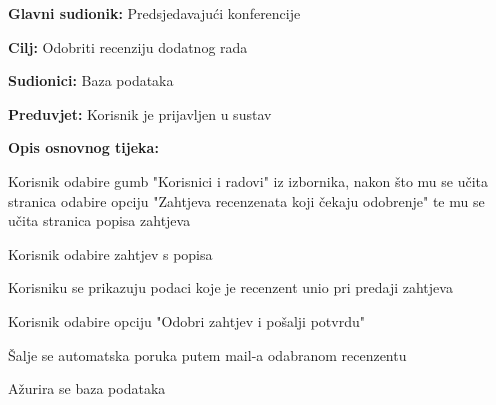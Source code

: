 					\noindent {}
					\begin{packed_item}
	
						\item \textbf{Glavni sudionik: } Predsjedavajući konferencije
						\item  \textbf{Cilj:} Odobriti recenziju dodatnog rada
						\item  \textbf{Sudionici:} Baza podataka
						\item  \textbf{Preduvjet:} Korisnik je prijavljen u sustav
						\item  \textbf{Opis osnovnog tijeka:}
						
						\item[] \begin{packed_enum}
	
							\item Korisnik odabire gumb "Korisnici i radovi" iz izbornika, nakon što mu se učita stranica odabire opciju "Zahtjeva recenzenata koji čekaju odobrenje" te mu se učita stranica popisa zahtjeva
							\item Korisnik odabire zahtjev s popisa
							\item Korisniku se prikazuju podaci koje je recenzent unio pri predaji zahtjeva
							\item Korisnik odabire opciju "Odobri zahtjev i pošalji potvrdu"
							\item Šalje se automatska poruka putem mail-a odabranom recenzentu
							\item Ažurira se baza podataka
					
						\end{packed_enum}
			
					\end{packed_item}

